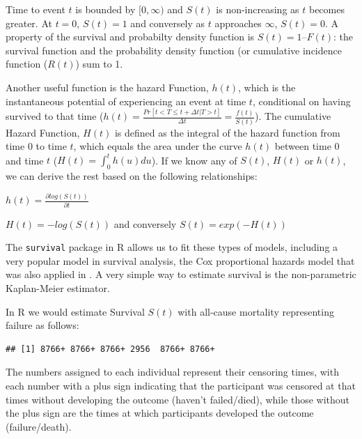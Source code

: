 \documentclass[
]{book}
\newenvironment{Shaded}{\begin{snugshade}}{\end{snugshade}}
\newcommand{\FunctionTok}[1]{\textcolor[rgb]{0.00,0.00,0.00}{#1}}
\newcommand{\NormalTok}[1]{#1}
\newcommand{\OtherTok}[1]{\textcolor[rgb]{0.56,0.35,0.01}{#1}}
\newcommand{\SpecialCharTok}[1]{\textcolor[rgb]{0.00,0.00,0.00}{#1}}
\begin{document}
Time to event \(t\) is bounded by \([0,\infty)\) and \(S(t)\) is non-increasing as \(t\) becomes greater. At \(t=0\), \(S(t)=1\) and conversely as \(t\) approaches \(\infty\), \(S(t)=0\). A property of the survival and probabilty density function is \(S(t) = 1 – F(t)\): the survival function and the probability density function (or cumulative incidence function (\(R(t)\)) sum to 1.

Another useful function is the hazard Function, \(h(t)\), which is the instantaneous potential of experiencing an event at time \(t\), conditional on having survived to that time (\(h(t)=\frac{Pr[t<T\leq t+\Delta t|T>t]}{\Delta t}=\frac{f(t)}{S(t)}\)). The cumulative Hazard Function, \(H(t)\) is defined as the integral of the hazard function from time \(0\) to time \(t\), which equals the area under the curve \(h(t)\) between time \(0\) and time \(t\) (\(H(t)=\int_{0}^{t}h(u)du\)).
If we know any of \(S(t)\), \(H(t)\) or \(h(t)\), we can derive the rest based on the following relationships:

\(h(t)=\frac{\partial log(S(t))}{\partial t}\)

\(H(t)=-log(S(t))\) and conversely \(S(t)=exp(-H(t))\)

The \texttt{survival} package in R allows us to fit these types of models, including a very popular model in survival analysis, the Cox proportional hazards model that was also applied in \citet{wong1989risk}. A very simple way to estimate survival is the non-parametric Kaplan-Meier estimator.

In R we would estimate Survival \(S(t)\) with all-cause mortality representing failure as follows:

\begin{Shaded}
\end{Shaded}

\begin{verbatim}
## [1] 8766+ 8766+ 8766+ 2956  8766+ 8766+
\end{verbatim}

The numbers assigned to each individual represent their censoring times, with each number with a plus sign indicating that the participant was censored at that times without developing the outcome (haven't failed/died), while those without the plus sign are the times at which participants developed the outcome (failure/death).
\end{document}
